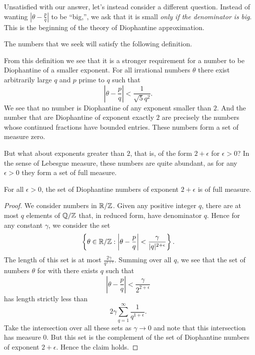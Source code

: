 \documentclass[twoside,letterpaper,10pt]{article}
\numberwithin{equation}{section}
\begin{document}
Unsatisfied with our answer, let's instead consider a different question.
Instead of wanting $\left| \theta - \frac{p}{q} \right|$ to be ``big,'', we ask
that it is small \emph{only if the denominator is big}.
This is the beginning of the theory of Diophantine approximation.

The numbers that we seek will satisfy the following definition.
\begin{defn}
  \dionumber{}
\end{defn}
From this definition we see that it is a stronger requirement for a number to be
Diophantine of a smaller exponent.
For all irrational numbers $\theta$ there exist arbitrarily large $q$ and $p$
prime to $q$ such that
\begin{equation*}
  \left| \theta - \frac{p}{q} \right| < \frac{1}{\sqrt{5}q^2}.
\end{equation*}
We see that no number is Diophantine of any exponent smaller than $2$.
And the number that are Diophantine of exponent exactly $2$ are precisely the
numbers whose continued fractions have bounded entries.
These numbers form a set of measure zero.

But what about exponents greater than $2$, that is, of the form $2 + \epsilon$
for $\epsilon > 0$?
In the sense of Lebesgue measure, these numbers are quite abundant, as for any
$\epsilon > 0$ they form a set of full measure.
\begin{prop}
  \label{prop:dio-num-with-full-meas}
  For all $\epsilon > 0$, the set of Diophantine numbers of exponent $2 +
  \epsilon$ is of full measure.
\end{prop}
\begin{proof}
  We consider numbers in $\mathbb{R} / \mathbb{Z}$.
  Given any positive integer $q$, there are at most $q$ elements of $\mathbb{Q} / \mathbb{Z}$
  that, in reduced form, have denominator $q$.
  Hence for any constant $\gamma$, we consider the set
  \begin{equation*}
    \left\{ \theta \in \mathbb{R} / \mathbb{Z} : \left| \theta - \frac{p}{q} \right| <
      \frac{\gamma}{|q|^{2 + \epsilon}} \right\}.
  \end{equation*}
  The length of this set is at most $\frac{2\gamma}{q^{1 + \epsilon}}$.
  Summing over all $q$, we see that the set of numbers $\theta$ for with there
  exists $q$ such that
  \begin{equation*}
    \left| \theta - \frac{p}{q} \right| < \frac{\gamma}{2^{2 + \epsilon}}
  \end{equation*}
  has length strictly less than
  \begin{equation*}
    2 \gamma \sum_{q = 1}^{\infty} \frac{1}{q^{1 + \epsilon}}.
  \end{equation*}
  Take the intersection over all these sets as $\gamma \to 0$ and note that this
  intersection has measure $0$.
  But this set is the complement of the set of Diophantine numbers of exponent
  $2 + \epsilon$.
  Hence the claim holds.
\end{proof}
\end{document}
